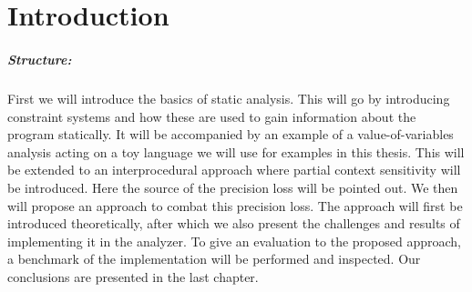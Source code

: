 
\chapter{Introduction}\label{chapter:introduction}



  

\paragraph{Structure:} %
First we will introduce the basics of static analysis. This will go by introducing constraint systems and how these are used to gain information about the program statically. It will be accompanied by an example of a value-of-variables analysis acting on a toy language we will use for examples in this thesis. This will be extended to an interprocedural approach where partial context sensitivity will be introduced. Here the source of the precision loss will be pointed out. We then will propose an approach to combat this precision loss. The approach will first be introduced theoretically, after which we also present the challenges and results of implementing it in the \Gob analyzer. To give an evaluation to the proposed approach, a benchmark of the implementation will be performed and inspected. Our conclusions are presented in the last chapter.
